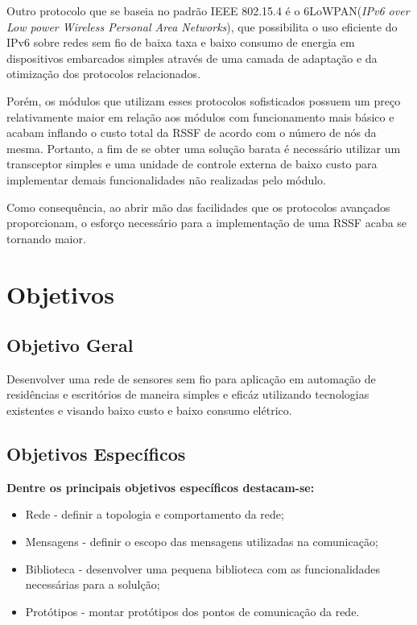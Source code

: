 \documentclass[
    12pt,               %
    a4paper,            %
    english,            %
    brazil,             %
    ]{article}
\begin{document}
Outro protocolo que se baseia no padrão IEEE 802.15.4 é o 6LoWPAN(\textit{IPv6 over Low power Wireless Personal Area Networks}),
que possibilita o uso eficiente do IPv6 sobre redes sem fio de baixa taxa e baixo consumo de energia em dispositivos embarcados
simples através de uma camada de adaptação e da otimização dos protocolos relacionados. \cite{shelby_bormann2009}

Porém, os módulos que utilizam esses protocolos sofisticados possuem um preço relativamente maior em relação aos módulos com
funcionamento mais básico e acabam inflando o custo total da RSSF de acordo com o número de nós da mesma. Portanto, a fim de se
obter uma solução barata é necessário utilizar um transceptor simples e uma unidade de controle externa de baixo custo para
implementar demais funcionalidades não realizadas pelo módulo.

Como consequência, ao abrir mão das facilidades que os protocolos avançados proporcionam, o esforço necessário para a
implementação de uma RSSF acaba se tornando maior.

\section{Objetivos}


	\subsection{Objetivo Geral}

	Desenvolver uma rede de sensores sem fio para aplicação em automação de residências e escritórios de maneira simples e eficáz
	utilizando tecnologias existentes e visando baixo custo e baixo consumo elétrico.

	\subsection{Objetivos Específicos}

	{\bf Dentre os principais objetivos específicos destacam-se: }
	\begin{itemize}
		\item Rede - definir a topologia e comportamento da rede;
		\item Mensagens - definir o escopo das mensagens utilizadas na comunicação;
		\item Biblioteca - desenvolver uma pequena biblioteca com as funcionalidades necessárias para a solulção;
		\item Protótipos - montar protótipos dos pontos de comunicação da rede.
	\end{itemize}
\end{document}
